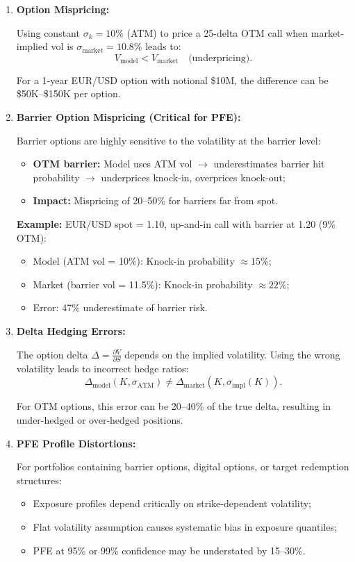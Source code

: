 \begin{enumerate}
	\item \textbf{Option Mispricing:}
	
	Using constant $\sigma_k = 10\%$ (ATM) to price a 25-delta OTM call when market-implied vol is $\sigma_{\text{market}} = 10.8\%$ leads to:
	\begin{equation}
		V_{\text{model}} < V_{\text{market}} \quad \text{(underpricing)}.
	\end{equation}
	
	For a 1-year EUR/USD option with notional \$10M, the difference can be \$50K--\$150K per option.
	
	\item \textbf{Barrier Option Mispricing (Critical for PFE):}
	
	Barrier options are highly sensitive to the volatility at the barrier level:
	\begin{itemize}
		\item \textbf{OTM barrier:} Model uses ATM vol $\rightarrow$ underestimates barrier hit probability $\rightarrow$ underprices knock-in, overprices knock-out;
		\item \textbf{Impact:} Mispricing of 20--50\% for barriers far from spot.
	\end{itemize}
	
	\textbf{Example:} EUR/USD spot = 1.10, up-and-in call with barrier at 1.20 (9\% OTM):
	\begin{itemize}
		\item Model (ATM vol = 10\%): Knock-in probability $\approx 15\%$;
		\item Market (barrier vol = 11.5\%): Knock-in probability $\approx 22\%$;
		\item Error: 47\% underestimate of barrier risk.
	\end{itemize}
	
	\item \textbf{Delta Hedging Errors:}
	
	The option delta $\Delta = \frac{\partial V}{\partial S}$ depends on the implied volatility. Using the wrong volatility leads to incorrect hedge ratios:
	\begin{equation}
		\Delta_{\text{model}}(K, \sigma_{\text{ATM}}) \neq \Delta_{\text{market}}(K, \sigma_{\text{impl}}(K)).
	\end{equation}
	
	For OTM options, this error can be 20--40\% of the true delta, resulting in under-hedged or over-hedged positions.
	
	\item \textbf{PFE Profile Distortions:}
	
	For portfolios containing barrier options, digital options, or target redemption structures:
	\begin{itemize}
		\item Exposure profiles depend critically on strike-dependent volatility;
		\item Flat volatility assumption causes systematic bias in exposure quantiles;
		\item PFE at 95\% or 99\% confidence may be understated by 15--30\%.
	\end{itemize}
\end{enumerate}

